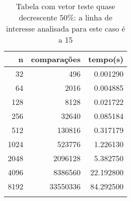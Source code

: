 \begin{table}[ht]
\centering
\begin{tabular}{rrr} \toprule
        n &    comparações &       tempo(s) \\ \midrule
      32  &            496 &      0.001290 \\
      64  &           2016 &      0.004885 \\
     128  &           8128 &      0.021722 \\
     256  &          32640 &      0.085184 \\
     512  &         130816 &      0.317179 \\
    1024  &         523776 &      1.226130 \\
    2048  &        2096128 &      5.382750 \\
    4096  &        8386560 &     22.192800 \\
    8192  &       33550336 &     84.292500 \\
\bottomrule\addlinespace
\end{tabular}
\caption{Tabela com vetor teste quase decrescente 50\%: a linha de interesse analisada para este caso é a 15}
\label{tab:bolhaQuaseDecresc50}
\end{table}
